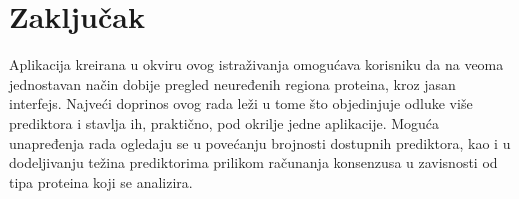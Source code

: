 \chapter{Zaključak}
Aplikacija kreirana u okviru ovog istraživanja omogućava korisniku da na veoma jednostavan način dobije pregled neuređenih regiona proteina, kroz jasan interfejs. Najveći doprinos ovog rada leži u tome što objedinjuje odluke više prediktora i stavlja ih, praktično, pod okrilje jedne aplikacije. Moguća unapređenja rada ogledaju se u povećanju brojnosti dostupnih prediktora, kao i u dodeljivanju težina prediktorima prilikom računanja konsenzusa u zavisnosti od tipa proteina koji se analizira. 